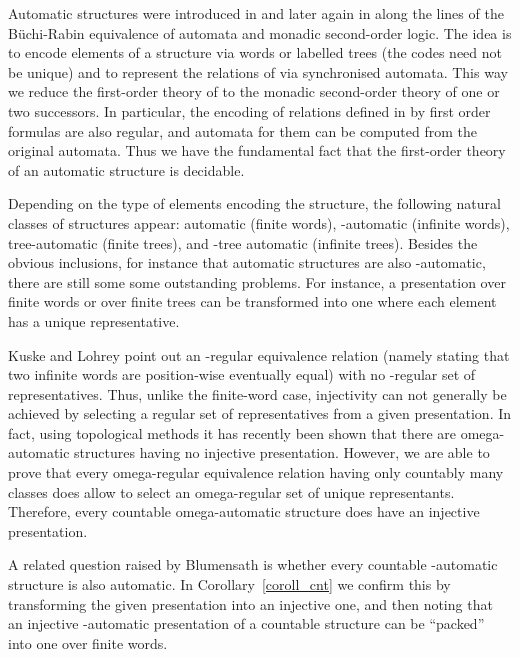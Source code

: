 \documentclass{stacs_proc}
\begin{document}
\setlength{\parskip}{0pt}



Automatic structures were introduced in \cite{Hod83} and later again in
\cite{KN95,BG00} along the lines of the B\"uchi-Rabin equivalence of automata and
monadic second-order logic. The idea is to encode elements of a
structure  via words or labelled trees (the codes need not be unique)
and to represent the relations of  via synchronised automata. This way
we reduce the first-order theory of  to the monadic second-order theory
of one or two successors.  In particular, the encoding of relations defined in
 by first order formulas are also regular, and automata for them can be
computed from the original automata. Thus we have the fundamental fact that the
first-order theory of an automatic structure is decidable. 

Depending on the type of elements encoding the structure, the following natural
classes of structures appear: automatic (finite words), -automatic
(infinite words), tree-automatic (finite trees), and -tree automatic
(infinite trees). Besides the obvious inclusions, for instance that automatic
structures are also -automatic, there are still some some outstanding
problems.  For instance, a presentation over finite words or over finite trees 
can be transformed into one where each element has a unique representative. 

Kuske and Lohrey \cite{KL06} point out an -regular
equivalence relation (namely  stating that two infinite words are
position-wise eventually equal) with no -regular set of representatives.
Thus, unlike the finite-word case, injectivity can not generally be achieved by
selecting a regular set of representatives from a given presentation. 
In fact, using topological methods it has recently been shown \cite{HKMNman} 
that there are omega-automatic structures having no injective presentation.
However, we are able to prove that every omega-regular equivalence relation
having only countably many classes does allow to select an omega-regular
set of unique representants. Therefore, every countable omega-automatic structure 
does have an injective presentation.

A related question raised by Blumensath \cite{Blu99} is whether every countable
-automatic structure is also automatic. In Corollary~\ref{coroll_cnt} 
we confirm this by transforming the given presentation into an injective one, 
and then noting that an injective -automatic presentation of a countable 
structure can be ``packed'' into one over finite words.
\end{document}
